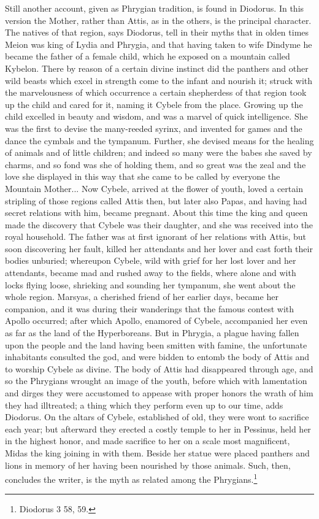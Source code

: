 \documentclass[a4paper, 11pt, oneside, polutonikogreek, english]{article}
\begin{document}
Still another account, given as Phrygian tradition, is found in Diodorus. In this version the Mother, rather than Attis, as in the others, is the principal character. The natives of that region, says Diodorus, tell in their myths that in olden times Meion was king of Lydia and Phrygia, and that having taken to wife Dindyme he became the father of a female child, which he exposed on a mountain called Kybelon. There by reason of a certain divine instinct did the panthers and other wild beasts which excel in strength come to the infant and nourish it; struck with the marvelousness of which occurrence a certain shepherdess of that region took up the child and cared for it, naming it Cybele from the place. Growing up the child excelled in beauty and wisdom, and was a marvel of quick intelligence. She was the first to devise the many-reeded syrinx, and invented for games and the dance the cymbals and the tympanum. Further, she devised means for the healing of animals and of little children; and indeed so many were the babes she saved by charms, and so fond was she of holding them, and so great was the zeal and the love she displayed in this way that she came to be called by everyone the Mountain Mother... Now Cybele, arrived at the flower of youth, loved a certain stripling of those regions called Attis then, but later also Papas, and having had secret relations with him, became pregnant. About this time the king and queen made the discovery that Cybele was their daughter, and she was received into the royal household. The father was at first ignorant of her relations with Attis, but soon discovering her fault, killed her attendants and her lover and cast forth their bodies unburied; whereupon Cybele, wild with grief for her lost lover and her attendants, became mad and rushed away to the fields, where alone and with locks flying loose, shrieking and sounding her tympanum, she went about the whole region. Marsyas, a cherished friend of her earlier days, became her companion, and it was during their wanderings that the famous contest with Apollo occurred; after which Apollo, enamored of Cybele, accompanied her even as far as the land of the Hyperboreans. But in Phrygia, a plague having fallen upon the people and the land having been smitten with famine, the unfortunate inhabitants consulted the god, and were bidden to entomb the body of Attis and to worship Cybele as divine. The body of Attis had disappeared through age, and so the Phrygians wrought an image of the youth, before which with lamentation and dirges they were accustomed to appease with proper honors the wrath of him they had illtreated; a thing which they perform even up to our time, adds Diodorus. On the altars of Cybele, established of old, they were wont to sacrifice each year; but afterward they erected a costly temple to her in Pessinus, held her in the highest honor, and made sacrifice to her on a scale most magnificent, Midas the king joining in with them. Beside her statue were placed panthers and lions in memory of her having been nourished by those animals. Such, then, concludes the writer, is the myth as related among the Phrygians.\footnote{Diodorus 3 58, 59.}
\end{document}
